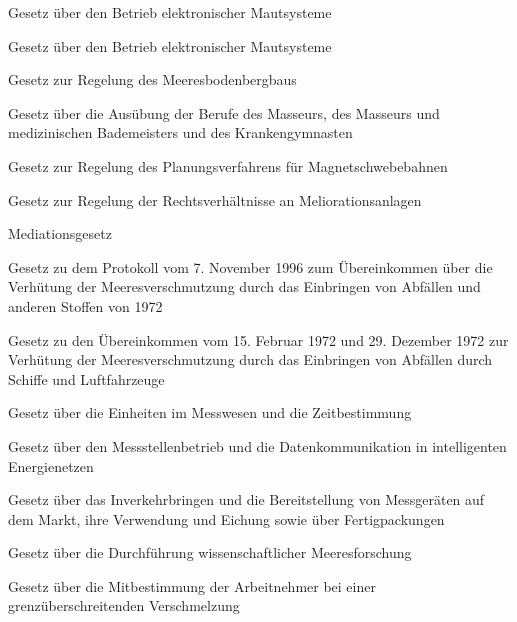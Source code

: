 \item[{MautSysG}] Gesetz über den Betrieb elektronischer Mautsysteme

\item[{MautSysG-2014}] Gesetz über den Betrieb elektronischer Mautsysteme

\item[{MBergG}] Gesetz zur Regelung des Meeresbodenbergbaus

\item[{MBKG}] Gesetz über die Ausübung der Berufe des Masseurs, des Masseurs und medizinischen Bademeisters und des Krankengymnasten

\item[{MBPlG}] Gesetz zur Regelung des Planungsverfahrens für Magnetschwebebahnen

\item[{MeAnlG}] Gesetz zur Regelung der Rechtsverhältnisse an Meliorationsanlagen

\item[{MediationsG}] Mediationsgesetz

\item[{MeerAbfSchAbkProtG}] Gesetz zu dem Protokoll vom 7. November 1996 zum Übereinkommen über die Verhütung der Meeresverschmutzung durch das Einbringen von Abfällen und anderen Stoffen von 1972

\item[{MeerSchÜbkG}] Gesetz zu den Übereinkommen vom 15. Februar 1972 und 29. Dezember 1972 zur Verhütung der Meeresverschmutzung durch das Einbringen von Abfällen durch Schiffe und Luftfahrzeuge

\item[{MeßEinhG}] Gesetz über die Einheiten im Messwesen und die Zeitbestimmung

\item[{MessbG}] Gesetz über den Messstellenbetrieb und die Datenkommunikation in intelligenten Energienetzen

\item[{MessEG}] Gesetz über das Inverkehrbringen und die Bereitstellung von Messgeräten auf dem Markt, ihre Verwendung und Eichung sowie über Fertigpackungen

\item[{MForschG}] Gesetz über die Durchführung wissenschaftlicher Meeresforschung

\item[{MgVG}] Gesetz über die Mitbestimmung der Arbeitnehmer bei einer grenzüberschreitenden Verschmelzung


